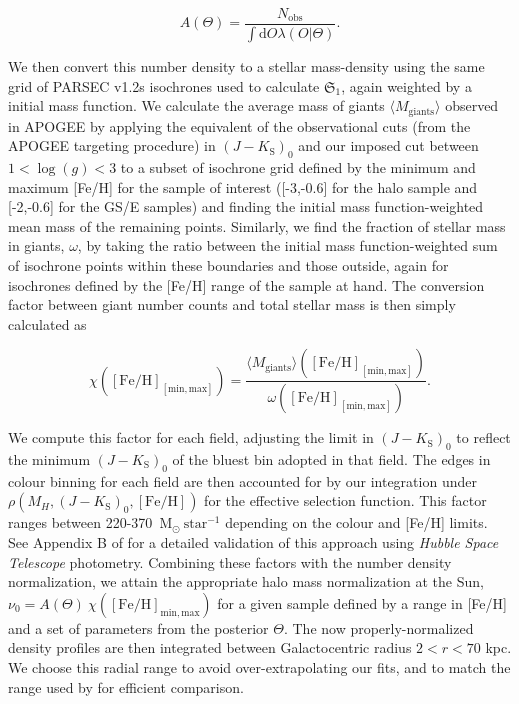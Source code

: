 \begin{equation}
\label{ch3:eq:density-normalization}
A(\Theta) = \frac{ N_\mathrm{obs} }{ \int \mathrm{d}O \lambda(O \vert \Theta) }.
\end{equation}

We then convert this number density to a stellar mass-density using the same grid of PARSEC v1.2s isochrones \parencite{bressan12} used to calculate $\mathfrak{S}_{1}$, again weighted by a \textcite{chabrier03} initial mass function. We calculate the average mass of giants $\langle M_{\mathrm{giants}} \rangle$ observed in APOGEE by applying the equivalent of the observational cuts (from the APOGEE targeting procedure) in $(J-K_\mathrm{S})_0$ and our imposed cut between $1 < \log(g) < 3$ to a subset of isochrone grid defined by the minimum and maximum [Fe/H] for the sample of interest ([-3,-0.6] for the halo sample and [-2,-0.6] for the GS/E samples) and finding the initial mass function-weighted mean mass of the remaining points. Similarly, we find the fraction of stellar mass in giants, $\omega$, by taking the ratio between the initial mass function-weighted sum of isochrone points within these boundaries and those outside, again for isochrones defined by the [Fe/H] range of the sample at hand. The conversion factor between giant number counts and total stellar mass is then simply calculated as 

\begin{equation}
\label{ch3:eq:isochrone-factors}
\chi \left( \mathrm{[Fe/H]_\mathrm{[min,max]}} \right) = \frac{\langle M_{\mathrm{giants}} \rangle \left( \mathrm{[Fe/H]}_\mathrm{[min,max]} \right) }{\omega \left( \mathrm{[Fe/H]}_{\mathrm{[min,max]}} \right) }.
\end{equation}

We compute this factor for each field, adjusting the limit in $(J-K_\mathrm{S})_0$ to reflect the minimum $(J-K_\mathrm{S})_0$ of the bluest bin adopted in that field. The edges in colour binning for each field are then accounted for by our integration under $\rho(M_{H},(J-K_\mathrm{S})_0,\mathrm{[Fe/H]})$ for the effective selection function. This factor ranges between 220-370~$\mathrm{M}_{\odot}~\mathrm{star}^{-1}$ depending on the colour and [Fe/H] limits. See Appendix B of \cite{mackereth20} for a detailed validation of this approach using \textit{Hubble Space Telescope} photometry. Combining these factors with the number density normalization, we attain the appropriate halo mass normalization at the Sun, $\nu_{0} = A(\Theta)~ \chi \left( \mathrm{[Fe/H]_\mathrm{min,max}} \right)$ for a given sample defined by a range in [Fe/H] and a set of parameters from the posterior $\Theta$. The now properly-normalized density profiles are then integrated between Galactocentric radius $2 < r < 70$ kpc. We choose this radial range to avoid over-extrapolating our fits, and to match the range used by \cite{mackereth20} for efficient comparison. 

